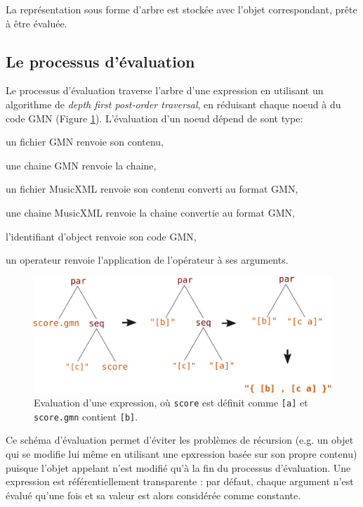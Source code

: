 \documentclass{article}
\newcommand{\OSC}[1]{\texttt{#1}}
\let\olditemize\itemize
\let\oldenditemize\enditemize
\renewenvironment{itemize} 	{\olditemize \setlength{\itemsep}{1mm}}{\oldenditemize}
\begin{document}
La représentation sous forme d'arbre est stockée avec l'objet correspondant, prête à être évaluée.

\subsection{Le processus d'évaluation}
Le processus d'évaluation traverse l'arbre d'une expression en utilisant un algorithme de \textit{depth first post-order traversal}, en réduisant chaque noeud à du code GMN (Figure \ref{fig:classicEval}).
L'évaluation d'un noeud dépend de sont type:
\begin{itemize}
\item un fichier GMN renvoie son contenu,
\item une chaine GMN renvoie la chaine,
\item un fichier MusicXML renvoie son contenu converti au format GMN,
\item une chaine MusicXML renvoie la chaine convertie au format GMN,
\item l'identifiant d'object renvoie son code GMN,
\item un operateur renvoie l'application de l'opérateur à ses arguments.
\end{itemize}

\begin{figure}[th]
\centering
\includegraphics[width=1\columnwidth]{imgs/classicEval}
\caption{Evaluation d'une expression,
où \OSC{score} est définit comme \OSC{[a]}
et \OSC{score.gmn} contient \OSC{[b]}.
\label{fig:classicEval} }
\end{figure}

Ce schéma d'évaluation permet d'éviter les problèmes de récursion (e.g. un objet qui se modifie lui même en utilisant une epxression basée sur son propre contenu) puisque l'objet appelant n'est modifié qu'à la fin du processus d'évaluation. 
Une expression est référentiellement transparente : par défaut, chaque argument n'est évalué qu'une fois et sa valeur est alors considérée comme constante.
\end{document}
